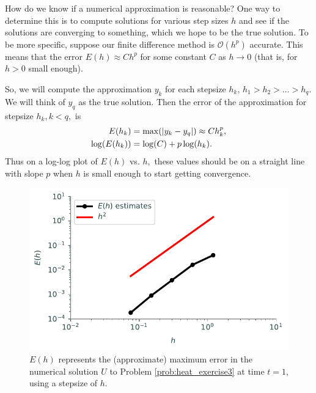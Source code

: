 How do we know if a numerical approximation is reasonable?
One way to determine this is to compute solutions for various step sizes $h$ and see if the solutions are converging to something, which we hope to be the true solution.
To be more specific, suppose our finite difference method is $\mathcal{O}(h^p)$ accurate.
This means that the error $E(h) \approx Ch^p$ for some constant $C$ as $h \to 0$ (that is, for $h>0$ small enough).

So, we will compute the approximation $y_k$ for each stepsize $h_k$, $h_1 > h_2> \ldots>h_q.$
We will think of $y_q$ as the true solution.
Then the error of the approximation for stepsize $h_k, k < q,$ is
\begin{align*}
	E(h_k) &= \max( \left\lvert y_k - y_q\right\rvert) \approx C h_k^p ,\\
	\log(E(h_k)) &= \log(C) + p \log(h_k).
\end{align*}
Thus on a log-log plot of $E(h)$ vs. $h,$ these values should be on a straight line with slope $p$ when $h$ is small enough to start getting convergence.

\begin{figure}
\centering
\includegraphics[width=\textwidth]{figures/MaximumError.pdf}
\caption{$E(h)$ represents the (approximate) maximum error in the numerical solution $U$ to Problem \ref{prob:heat_exercise3} at time $t=1$, using a stepsize of $h$.}
\label{fig:heatexercise3}
\end{figure}

